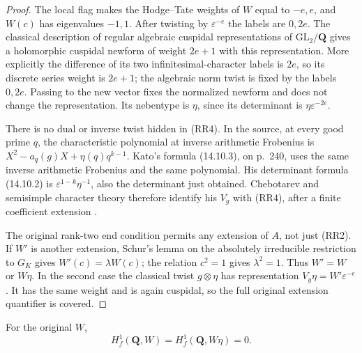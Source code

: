 \begin{proof}
The local flag makes the Hodge--Tate weights of $W$ equal to
$-e,e$, and $W(c)$ has eigenvalues $-1,1$.  After twisting by
$\varepsilon^{-e}$ the labels are $0,2e$.  The classical
description of regular algebraic cuspidal representations of
$\mathrm{GL}_2/\mathbf Q$ gives a holomorphic cuspidal newform of
weight $2e+1$ with this representation.  More explicitly the difference
of its two infinitesimal-character labels is $2e$, so its discrete
series weight is $2e+1$; the algebraic norm twist is fixed by the
labels $0,2e$.  Passing to the new vector fixes the normalized
newform and does not change the representation.  Its nebentype is
$\eta$, since its determinant is $\eta\varepsilon^{-2e}$.

There is no dual or inverse twist hidden in (RR4).  In the source,
at every good prime $q$, the characteristic polynomial at inverse
arithmetic Frobenius is
$X^2-a_q(g)X+\eta(q)q^{k-1}$.  Kato's formula (14.10.3), on
p.~240, uses the same inverse arithmetic Frobenius and the same
polynomial.  His determinant formula (14.10.2) is
$\varepsilon^{1-k}\eta^{-1}$, also the determinant just obtained.
Chebotarev and semisimple character theory therefore identify his
$V_g$ with (RR4), after a finite coefficient extension
\cite{support-type-two-kato}.

The original rank-two end condition permits any extension of $A$,
not just (RR2).  If $W'$ is another extension, Schur's lemma on
the absolutely irreducible restriction to $G_K$ gives
$W'(c)=\lambda W(c)$; the relation $c^2=1$ gives
$\lambda^2=1$.  Thus $W'=W$ or $W\eta$.  In the second case
the classical twist $g\otimes\eta$ has representation
$V_g\eta=W'\varepsilon^{-e}$.  It has the same weight and
is again cuspidal, so the full original extension quantifier is covered.
\end{proof}

\begin{lemma}
\label{lem:support-type-two-kato}
For the original $W$,
\[
          H_f^1(\mathbf Q,W)=H_f^1(\mathbf Q,W\eta)=0.            \tag{RR5}
\]
\end{lemma}

